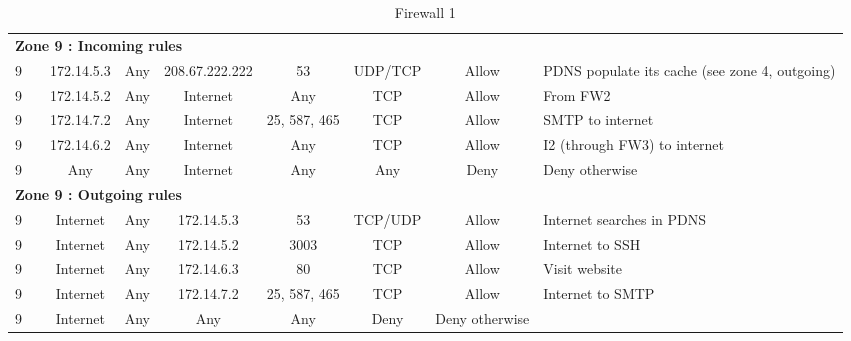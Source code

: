 \documentclass[a4paper,titlepage]{article}
\begin{document}
\begin{landscape}
\begin{table}[h]
\begin{tabular}{c|c|cc|cc|ccl}
			\hline
			\multicolumn{9}{l}{\textbf{Zone 9 : Incoming rules}}\\
			9 &  & 172.14.5.3 & Any & 208.67.222.222 & 53 & UDP/TCP & Allow & PDNS populate its cache (see zone 4, outgoing)\\
			9 &  & 172.14.5.2 & Any & Internet & Any & TCP & Allow & From FW2\\
			9 &  & 172.14.7.2 & Any & Internet & 25, 587, 465 & TCP & Allow & SMTP to internet\\
			9 &  & 172.14.6.2 & Any & Internet & Any & TCP & Allow & I2 (through FW3) to internet\\
			9 &  & Any & Any & Internet & Any & Any & Deny & Deny otherwise\\

			\hline
			\multicolumn{9}{l}{\textbf{Zone 9 : Outgoing rules}}\\
			9 &  & Internet & Any & 172.14.5.3 & 53 & TCP/UDP & Allow & Internet searches in PDNS\\
			9 &  & Internet & Any & 172.14.5.2 & 3003 & TCP & Allow & Internet to SSH\\
			9 &  & Internet & Any & 172.14.6.3 & 80 & TCP & Allow & Visit website\\
			9 &  & Internet & Any & 172.14.7.2 & 25, 587, 465 & TCP & Allow & Internet to SMTP\\
			9 &  & Internet & Any & Any & Any & Deny & Deny otherwise


		\end{tabular}
		\caption{Firewall 1}
	\end{table}
	\vspace*{\fill}
\end{landscape}


\end{document}
